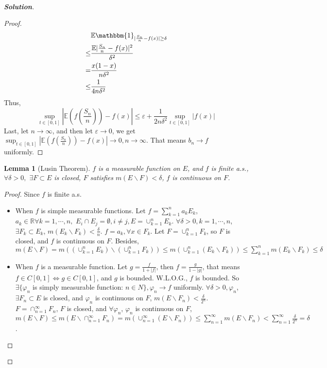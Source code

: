 \documentclass{ctexart}
\newenvironment{solution}{\begin{proof}[\textbf{Solution}]}{\end{proof}}
\renewcommand\phi{\varphi}
\renewcommand{\(}{\left(}
\renewcommand{\)}{\right)}
\newcommand{\E}{\mathbb{E}}
\newcommand{\R}{\mathbb{R}}
\newcommand{\shi}{\mathbbm{1}}
\renewcommand{\epsilon}{\varepsilon}
\newcommand{\minus}{\mathbin{\backslash}}
\newtheorem{lemma}{Lemma}
\begin{document}
\begin{solution}
\begin{proof}
\begin{equation}
\begin{aligned}
&\E{\shi_{|\frac{S_n}{n}-f(x)|\geq\delta}}\\
\leq &\frac{\E{|\frac{S_n}{n}-f(x)|^2}}{\delta^2}\\
=&\frac{x(1-x)}{n\delta^2}\\
\leq&\frac{1}{4n\delta^2}
\end{aligned}
\end{equation}
Thus, 
\begin{equation}
\sup_{t\in[0,1]}|\E(f(\frac{S_n}{n}))-f(x)|\leq\epsilon+\frac{1}{2n\delta^2}\sup_{t\in[0,1]}|f(x)|
\end{equation}
Last, let $n\to\infty$, and then let $\epsilon\to 0$, we get $\sup_{t\in[0,1]}|\E(f(\frac{S_n}{n}))-f(x)|\to0,n\to\infty$.
That means $b_n\to f$ uniformly.
\end{proof}
\begin{lemma}[Lusin Theorem]\label{lem:2}
$f$ is a measurable function on $E$, and $f$ is finite a.s., $\forall \delta>0,$ $\exists F\subset E$ is closed, $F$ satisfies $m(E\minus F)<\delta$, $f$ is continuous on $F$.
\end{lemma}
\begin{proof}
Since $f$ is finite a.s.
\begin{itemize}
\item When $f$ is simple measurable functions. 
Let $f=\sum_{k=1}^{n}a_kE_k$, $a_k\in \R\forall k=1,\cdots,n,$ $E_i\cap E_j=\emptyset, i\neq j, E=\cup_{k=1}^{n}E_k$.
$\forall \delta>0,k=1,\cdots, n$, $\exists F_k\subset E_k$, $m(E_k\minus F_k)<\frac{\delta}{n}$. $f=a_k,\forall x\in F_k$. 
Let $F=\cup_{k=1}^n F_k$, so $F$ is closed, and $f$ is continuous on $F$.
Besides, $m(E\minus F)= m((\cup_{k=1}^n E_k)\minus (\cup_{k=1}^n F_k))\leq m(\cup_{k=1}^n (E_k\minus F_k))\leq\sum_{k=1}^n m(E_k\minus F_k)\leq \delta$
\item When $f$ is a measurable function. Let $g=\frac{f}{1+|f|}$, then $f=\frac{g}{1-|g|}$, that means $f\in C[0,1]\Leftrightarrow g\in C[0,1]$, and $g$ is bounded. 
W.L.O.G., $f$ is bounded. So $\exists\{\phi_n$ is simply measurable function: $n\in N\}, \phi_n\to f$ uniformly. 
$\forall \delta>0, \phi_n$, $\exists F_n\subset E$ is closed, and $\phi_n$ is continuous on $F$, $m(E\minus F_n)<\frac{\delta}{2^n}$.
$F=\cap_{n=1}^{\infty}F_n$, $F$ is closed, and $\forall \phi_n$, $\phi_n$ is continuous on $F$, 
$m(E\minus F)\leq m(E\minus\cap_{n=1}^{\infty}F_n)=m(\cup_{n=1}^{\infty}(E\minus F_n))\leq\sum_{n=1}^{\infty}m(E\minus F_n)<\sum_{n=1}^{\infty}\frac{\delta}{2^n}=\delta$. 

\end{itemize}
\end{proof}
\end{solution}
\end{document}
